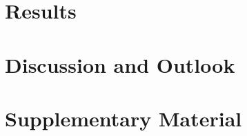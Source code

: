 \documentclass[11pt, letterpaper, titlepage]{article}
\begin{document}
\section{Results} 

\FloatBarrier

\section{Discussion and Outlook}

\section{Supplementary Material}

\pagebreak
\FloatBarrier

\renewcommand{\bibname}{References}  %
\printbibliography
\end{document}
